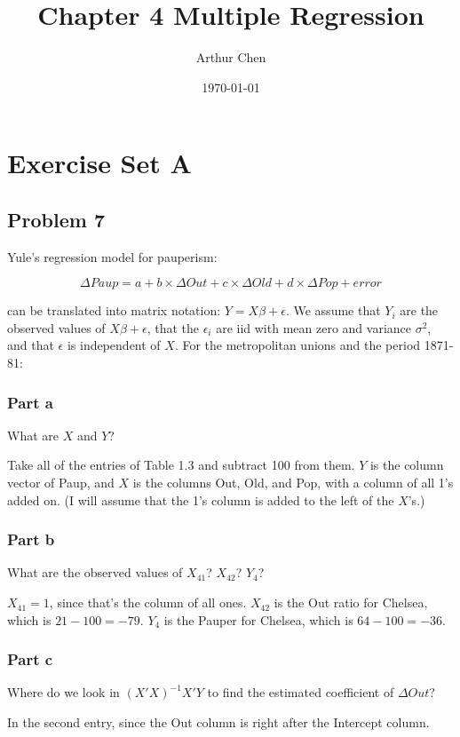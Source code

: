 \documentclass{article}
\author{Arthur Chen}
\title{Chapter 4 Multiple Regression}
\date{\today}
\begin{document}
\maketitle

\section*{Exercise Set A}

\subsection*{Problem 7}

Yule's regression model for pauperism:

\[
\Delta Paup = a + b \times \Delta Out + c \times \Delta Old + d \times \Delta Pop + error
\]

can be translated into matrix notation: $Y = X\beta + \epsilon$. We assume that $Y_i$ are the observed values of $X\beta + \epsilon$, that the $\epsilon_i$ are iid with mean zero and variance $\sigma^2$, and that $\epsilon$ is independent of $X$. For the metropolitan unions and the period 1871-81:

\subsubsection*{Part a}

What are $X$ and $Y$?

Take all of the entries of Table 1.3 and subtract 100 from them. $Y$ is the column vector of Paup, and $X$ is the columns Out, Old, and Pop, with a column of all 1's added on. (I will assume that the 1's column is added to the left of the $X$'s.)

\subsubsection*{Part b}

What are the observed values of $X_{41}$? $X_{42}$? $Y_4$?

$X_{41} = 1$, since that's the column of all ones. $X_{42}$ is the Out ratio for Chelsea, which is $21-100 = -79$. $Y_4$ is the Pauper for Chelsea, which is $64-100 = -36$.

\subsubsection*{Part c}

Where do we look in $(X'X)^{-1}X'Y$ to find the estimated coefficient of $\Delta Out$?

In the second entry, since the Out column is right after the Intercept column.
\end{document}
